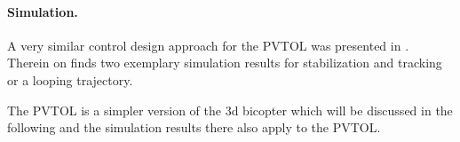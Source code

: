 \paragraph{Simulation.}
A very similar control design approach for the PVTOL was presented in \cite{Konz:AT}.
Therein on finds two exemplary simulation results for stabilization and tracking or a looping trajectory.

The PVTOL is a simpler version of the 3d bicopter which will be discussed in the following and the simulation results there also apply to the PVTOL.


